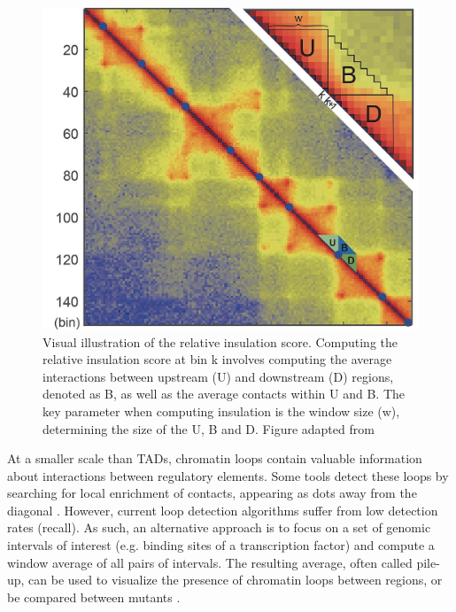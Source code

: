 \begin{figure}[htb]
    \includegraphics[width=\textwidth]{Parts/Part01/gfx/insulation_score_hicdb.jpeg}
    \caption{Visual illustration of the relative insulation score. Computing the relative insulation score at bin k involves computing the average interactions between upstream (U) and downstream (D) regions, denoted as B, as well as the average contacts within U and B. The key parameter when computing insulation is the window size (w), determining the size of the U, B and D. Figure adapted from \cite{chenHiCDBSensitiveRobust2018}}
    \label{fig:01-02:insulation}
\end{figure}


At a smaller scale than \acrshort{TAD}s, chromatin loops contain valuable information about interactions between regulatory elements. Some tools detect these loops by searching for local enrichment of contacts, appearing as dots away from the diagonal \citep{durandJuiceboxProvidesVisualization2016,ramirezHighresolutionTADsReveal2018}. However, current loop detection algorithms suffer from low detection rates (recall). As such, an alternative approach is to focus on a set of genomic intervals of interest (e.g. binding sites of a transcription factor) and compute a window average of all pairs of intervals. The resulting average, often called pile-up, can be used to visualize the presence of chromatin loops between regions, or be compared between mutants \cite{flyamerCoolpupPyVersatile2020}.

